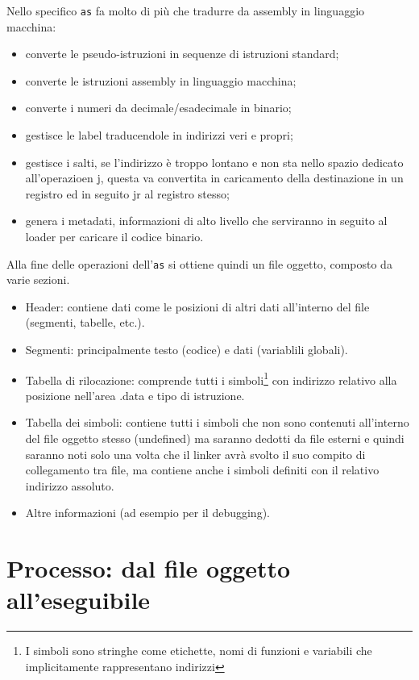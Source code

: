 \documentclass[class=book, crop=false, oneside]{standalone}
\begin{document}
Nello specifico \texttt{as} fa molto di più che tradurre da assembly in linguaggio macchina:
\begin{itemize}
	\item converte le pseudo-istruzioni in sequenze di istruzioni standard;
	\item converte le istruzioni assembly in linguaggio macchina;
	\item converte i numeri da decimale/esadecimale in binario;
	\item gestisce le label traducendole in indirizzi veri e propri;
	\item gestisce i salti, se l'indirizzo è troppo lontano e non sta nello spazio dedicato all'operazioen j, questa va convertita in caricamento della destinazione in un registro ed in seguito jr al registro stesso;
	\item genera i metadati, informazioni di alto livello che serviranno in seguito al loader per caricare il codice binario.
\end{itemize}

Alla fine delle operazioni dell'\texttt{as} si ottiene quindi un file oggetto, composto da varie sezioni.
\begin{itemize}
	\item Header: contiene dati come le posizioni di altri dati all'interno del file (segmenti, tabelle, etc.).
	\item Segmenti: principalmente testo (codice) e dati (variablili globali).
	\item Tabella di rilocazione: comprende tutti i simboli\footnote{I simboli sono stringhe come etichette, nomi di funzioni e variabili che implicitamente rappresentano indirizzi} con indirizzo relativo alla posizione nell'area .data e tipo di istruzione.
	\item Tabella dei simboli: contiene tutti i simboli che non sono contenuti all'interno del file oggetto stesso (undefined) ma saranno dedotti da file esterni e quindi saranno noti solo una volta che il linker avrà svolto il suo compito di collegamento tra file, ma contiene anche i simboli definiti con il relativo indirizzo assoluto.
	\item Altre informazioni (ad esempio per il debugging).
\end{itemize}

\section{Processo: dal file oggetto all'eseguibile}
\end{document}
